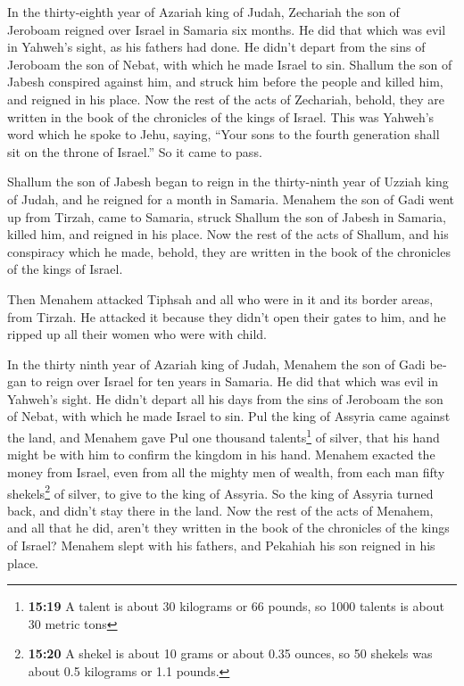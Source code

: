 \begin{paracol}{2}
\begin{otherlanguage}{english}
 In the thirty-eighth year of Azariah king of Judah,
Zechariah the son of Jeroboam reigned over Israel in Samaria six months.
 He did that which was evil in Yahweh's sight, as his
fathers had done. He didn't depart from the sins of Jeroboam the son of
Nebat, with which he made Israel to sin.  Shallum the son
of Jabesh conspired against him, and struck him before the people and
killed him, and reigned in his place.  Now the rest of
the acts of Zechariah, behold, they are written in the book of the
chronicles of the kings of Israel.  This was Yahweh's
word which he spoke to Jehu, saying, ``Your sons to the fourth
generation shall sit on the throne of Israel.'' So it came to pass.

 Shallum the son of Jabesh began to reign in the
thirty-ninth year of Uzziah king of Judah, and he reigned for a month in
Samaria.  Menahem the son of Gadi went up from Tirzah,
came to Samaria, struck Shallum the son of Jabesh in Samaria, killed
him, and reigned in his place.  Now the rest of the acts
of Shallum, and his conspiracy which he made, behold, they are written
in the book of the chronicles of the kings of Israel.

 Then Menahem attacked Tiphsah and all who were in it and
its border areas, from Tirzah. He attacked it because they didn't open
their gates to him, and he ripped up all their women who were with
child.

 In the thirty ninth year of Azariah king of Judah,
Menahem the son of Gadi began to reign over Israel for ten years in
Samaria.  He did that which was evil in Yahweh's sight.
He didn't depart all his days from the sins of Jeroboam the son of
Nebat, with which he made Israel to sin.  Pul the king of
Assyria came against the land, and Menahem gave Pul one thousand
talents\footnote{\textbf{15:19} A talent is about 30 kilograms or 66
  pounds, so 1000 talents is about 30 metric tons} of silver, that his
hand might be with him to confirm the kingdom in his hand.
 Menahem exacted the money from Israel, even from all the
mighty men of wealth, from each man fifty shekels\footnote{\textbf{15:20}
  A shekel is about 10 grams or about 0.35 ounces, so 50 shekels was
  about 0.5 kilograms or 1.1 pounds.} of silver, to give to the king of
Assyria. So the king of Assyria turned back, and didn't stay there in
the land.  Now the rest of the acts of Menahem, and all
that he did, aren't they written in the book of the chronicles of the
kings of Israel?  Menahem slept with his fathers, and
Pekahiah his son reigned in his place.


\end{otherlanguage}
\end{paracol}
